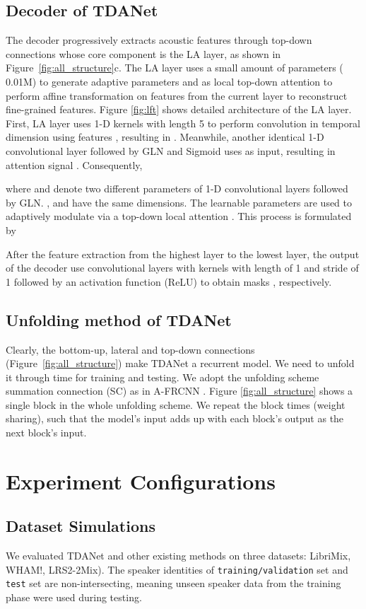 \documentclass{article} \usepackage{iclr2023_conference,times}
\begin{document}
\subsection{Decoder of TDANet}
\label{sec:lft}

The decoder progressively extracts acoustic features through top-down connections whose core component is the LA layer, as shown in Figure~\ref{fig:all_structure}c. The LA layer uses a small amount of parameters ( 0.01M) to generate adaptive parameters  and  as local top-down attention to perform affine transformation on features from the current layer to reconstruct fine-grained features. Figure \ref{fig:lft} shows detailed architecture of the LA layer. First, LA layer uses  1-D kernels with length 5 to perform convolution in temporal dimension using features , resulting in . Meanwhile, another identical 1-D convolutional layer followed by GLN and Sigmoid uses   as input, resulting in attention signal . Consequently,

where  and  denote two different parameters of 1-D convolutional layers followed by GLN. ,  and  have the same dimensions. The learnable parameters are used to adaptively modulate  via a top-down local attention . This process is formulated by 

After the feature extraction from the highest layer to the lowest layer, the output of the decoder use  convolutional layers with  kernels with length of 1 and stride of 1 followed by an activation function (ReLU) to obtain  masks , respectively.

\subsection{Unfolding method of TDANet}
\label{sec:re}


Clearly, the bottom-up, lateral and top-down connections (Figure~\ref{fig:all_structure}) make TDANet a recurrent model. We need to unfold it through time for training and testing. We adopt the unfolding scheme summation connection (SC) as in A-FRCNN \citep{hu2021speech}. Figure \ref{fig:all_structure} shows a single block in the whole unfolding scheme. We repeat the block  times (weight sharing), such that the model's input adds up with each block's output as the next block's input.

\section{Experiment Configurations}
\subsection{Dataset Simulations}
We evaluated TDANet and other existing methods on three datasets: LibriMix, WHAM!, LRS2-2Mix). The speaker identities of \texttt{training/validation} set and \texttt{test} set are non-intersecting, meaning unseen speaker data from the training phase were used during testing.
\end{document}
